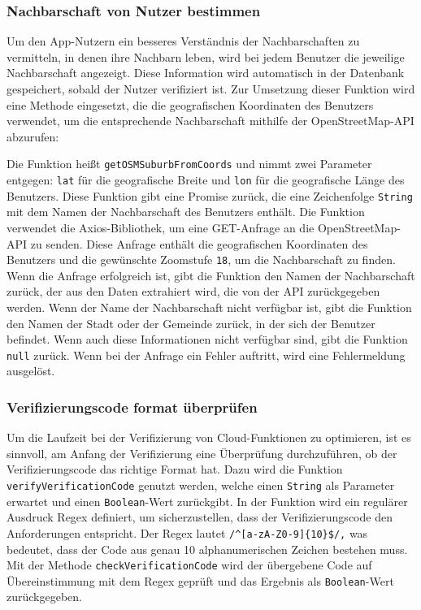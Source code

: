 \subsubsection{Nachbarschaft von Nutzer bestimmen}
Um den App-Nutzern ein besseres Verständnis der Nachbarschaften zu vermitteln, in denen ihre Nachbarn leben, wird bei jedem Benutzer die jeweilige Nachbarschaft angezeigt. Diese Information wird automatisch in der Datenbank gespeichert, sobald der Nutzer verifiziert ist. Zur Umsetzung dieser Funktion wird eine Methode eingesetzt, die die geografischen Koordinaten des Benutzers verwendet, um die entsprechende Nachbarschaft mithilfe der OpenStreetMap-API abzurufen:

Die Funktion heißt \texttt{getOSMSuburbFromCoords} und nimmt zwei Parameter entgegen: \texttt{lat} für die geografische Breite und \texttt{lon} für die geografische Länge des Benutzers. Diese Funktion gibt eine Promise zurück, die eine Zeichenfolge \texttt{String} mit dem Namen der Nachbarschaft des Benutzers enthält. Die Funktion verwendet die Axios-Bibliothek, um eine GET-Anfrage an die OpenStreetMap-API zu senden. Diese Anfrage enthält die geografischen Koordinaten des Benutzers und die gewünschte Zoomstufe \texttt{18}, um die Nachbarschaft zu finden. Wenn die Anfrage erfolgreich ist, gibt die Funktion den Namen der Nachbarschaft zurück, der aus den Daten extrahiert wird, die von der API zurückgegeben werden. Wenn der Name der Nachbarschaft nicht verfügbar ist, gibt die Funktion den Namen der Stadt oder der Gemeinde zurück, in der sich der Benutzer befindet. Wenn auch diese Informationen nicht verfügbar sind, gibt die Funktion \texttt{null} zurück. Wenn bei der Anfrage ein Fehler auftritt, wird eine Fehlermeldung ausgelöst.


\subsubsection{Verifizierungscode format überprüfen}
Um die Laufzeit bei der Verifizierung von Cloud-Funktionen zu optimieren, ist es sinnvoll, am Anfang der Verifizierung eine Überprüfung durchzuführen, ob der Verifizierungscode das richtige Format hat. Dazu wird die Funktion \texttt{verifyVerificationCode} genutzt werden, welche einen \texttt{String} als Parameter erwartet und einen \texttt{Boolean}-Wert zurückgibt. In der Funktion wird ein regulärer Ausdruck Regex definiert, um sicherzustellen, dass der Verifizierungscode den Anforderungen entspricht. Der Regex lautet \texttt{/}\verb|^[a-zA-Z0-9]{10}$/|\texttt{,} was bedeutet, dass der Code aus genau 10 alphanumerischen Zeichen bestehen muss. Mit der Methode \texttt{checkVerificationCode} wird der übergebene Code auf Übereinstimmung mit dem Regex geprüft und das Ergebnis als \texttt{Boolean}-Wert zurückgegeben.

